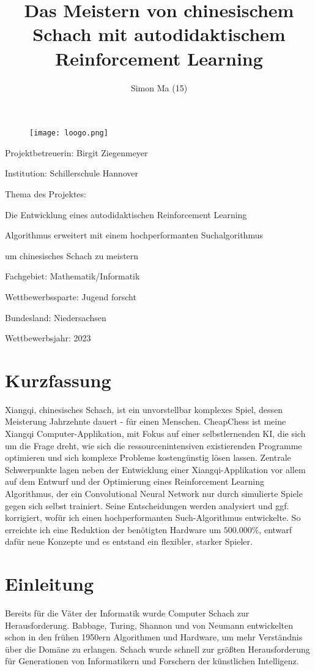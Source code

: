 \documentclass{jpp}
\title{Das Meistern von chinesischem Schach mit autodidaktischem Reinforcement Learning}
\author{Simon Ma (15)\aff{1}
  \corresp{\email{simon.mama07@gmail.com}}
  }
\affiliation{\aff{1}Schillerschule Hannover,
Ebellstr. 15, 30629 Hannover, Germany}
\begin{document}
\begin{figure}
\centering
\texttt{[image: loogo.png]}
\end{figure}
\maketitle


Projektbetreuerin: Birgit Ziegenmeyer

Institution: Schillerschule Hannover

Thema des Projektes:

Die Entwicklung eines autodidaktischen Reinforcement Learning 

Algorithmus erweitert mit einem hochperformanten Suchalgorithmus 

um chinesisches Schach zu meistern

Fachgebiet: Mathematik/Informatik

Wettbewerbssparte: Jugend forscht

Bundesland: Niedersachsen

Wettbewerbsjahr: 2023

\newpage

\tableofcontents

\newpage

\section{Kurzfassung}
Xiangqi, chinesisches Schach, ist ein unvorstellbar komplexes Spiel, dessen Meisterung Jahrzehnte dauert - für einen Menschen. 
CheapChess ist meine Xiangqi Computer-Applikation, mit Fokus auf einer selbstlernenden KI, die sich um die Frage dreht, wie sich die ressourcenintensiven existierenden Programme optimieren und sich komplexe Probleme kostengünstig lösen lassen.
Zentrale Schwerpunkte lagen neben der Entwicklung einer Xiangqi-Applikation vor allem auf dem Entwurf und der Optimierung eines Reinforcement Learning Algorithmus, der ein Convolutional Neural Network nur durch simulierte Spiele gegen sich selbst trainiert. Seine Entscheidungen werden analysiert und ggf. korrigiert, wofür ich einen hochperformanten Such-Algorithmus entwickelte. So erreichte ich eine Reduktion der benötigten Hardware um $500.000\%$, entwarf dafür neue Konzepte und es entstand ein flexibler, starker Spieler.
\section{Einleitung}\label{sec:einleitung}
Bereits für die Väter der Informatik wurde Computer Schach zur Herausforderung. Babbage, Turing, Shannon und von Neumann entwickelten schon in den frühen 1950ern Algorithmen und Hardware, um mehr Verständnis über die Domäne zu erlangen. Schach wurde schnell zur größten Herausforderung für Generationen von Informatikern und Forschern der künstlichen Intelligenz. 
\end{document}
